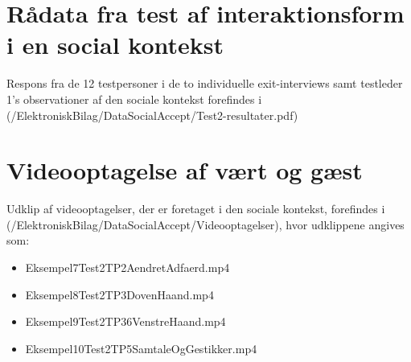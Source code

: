 \section{Rådata fra test af interaktionsform i en social kontekst}
\label{app:ResultaterSocialAccept}
%
Respons fra de 12 testpersoner i de to individuelle exit-interviews samt testleder 1's observationer af den sociale kontekst forefindes i (/ElektroniskBilag/DataSocialAccept/Test2-resultater.pdf)
%
\section{Videooptagelse af vært og gæst}
\label{app:VideooptagelseVaertOgGaest}
%
Udklip af videooptagelser, der er foretaget i den sociale kontekst, forefindes i (/ElektroniskBilag/DataSocialAccept/Videooptagelser), hvor udklippene angives som: \blankline
%
\begin{itemize}
  \item Eksempel7Test2TP2AendretAdfaerd.mp4
  \item Eksempel8Test2TP3DovenHaand.mp4
  \item Eksempel9Test2TP36VenstreHaand.mp4
  \item Eksempel10Test2TP5SamtaleOgGestikker.mp4
\end{itemize}
%

